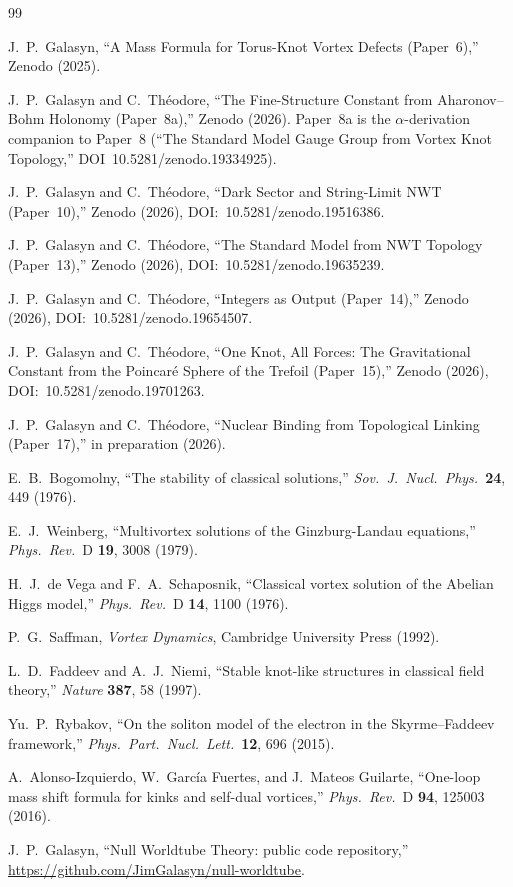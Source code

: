 \documentclass[11pt]{article}
\begin{document}
\begin{thebibliography}{99}

  J.~P.~Galasyn,
  ``A Mass Formula for Torus-Knot Vortex Defects (Paper~6),''
  Zenodo (2025).

  J.~P.~Galasyn and C.~Th\'eodore,
  ``The Fine-Structure Constant from Aharonov--Bohm Holonomy
  (Paper~8a),'' Zenodo (2026).  Paper~8a is the $\alpha$-derivation
  companion to Paper~8 (``The Standard Model Gauge Group from
  Vortex Knot Topology,'' DOI~10.5281/zenodo.19334925).

  J.~P.~Galasyn and C.~Th\'eodore,
  ``Dark Sector and String-Limit NWT (Paper~10),''
  Zenodo (2026), DOI:~10.5281/zenodo.19516386.

  J.~P.~Galasyn and C.~Th\'eodore,
  ``The Standard Model from NWT Topology (Paper~13),''
  Zenodo (2026), DOI:~10.5281/zenodo.19635239.

  J.~P.~Galasyn and C.~Th\'eodore,
  ``Integers as Output (Paper~14),''
  Zenodo (2026), DOI:~10.5281/zenodo.19654507.

  J.~P.~Galasyn and C.~Th\'eodore,
  ``One Knot, All Forces: The Gravitational Constant from the
  Poincar\'e Sphere of the Trefoil (Paper~15),''
  Zenodo (2026), DOI:~10.5281/zenodo.19701263.

  J.~P.~Galasyn and C.~Th\'eodore,
  ``Nuclear Binding from Topological Linking (Paper~17),''
  in preparation (2026).

  E.~B.~Bogomolny,
  ``The stability of classical solutions,''
  \emph{Sov.\ J.\ Nucl.\ Phys.}\ \textbf{24}, 449 (1976).

  E.~J.~Weinberg,
  ``Multivortex solutions of the Ginzburg-Landau equations,''
  \emph{Phys.\ Rev.}\ D \textbf{19}, 3008 (1979).

  H.~J.~de Vega and F.~A.~Schaposnik,
  ``Classical vortex solution of the Abelian Higgs model,''
  \emph{Phys.\ Rev.}\ D \textbf{14}, 1100 (1976).

  P.~G.~Saffman,
  \emph{Vortex Dynamics},
  Cambridge University Press (1992).

  L.~D.~Faddeev and A.~J.~Niemi,
  ``Stable knot-like structures in classical field theory,''
  \emph{Nature} \textbf{387}, 58 (1997).

  Yu.~P.~Rybakov,
  ``On the soliton model of the electron in the Skyrme--Faddeev
  framework,''
  \emph{Phys.\ Part.\ Nucl.\ Lett.}\ \textbf{12}, 696 (2015).

  A.~Alonso-Izquierdo, W.~Garc\'ia Fuertes, and J.~Mateos Guilarte,
  ``One-loop mass shift formula for kinks and self-dual vortices,''
  \emph{Phys.\ Rev.}\ D \textbf{94}, 125003 (2016).

  J.~P.~Galasyn,
  ``Null Worldtube Theory: public code repository,''
  \url{https://github.com/JimGalasyn/null-worldtube}.

\end{thebibliography}
\end{document}
